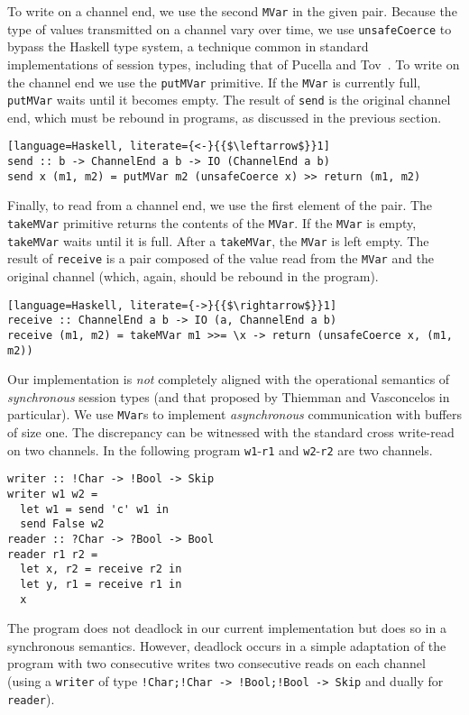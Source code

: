 To write on a channel end, we use the second \lstinline|MVar| in the
given pair. Because the type of values transmitted on a channel vary
over time, we use \lstinline|unsafeCoerce| to bypass the Haskell type
system, a technique common in standard implementations of session
types, including that of Pucella and
Tov~\cite{DBLP:conf/haskell/PucellaT08}. To write on the channel end
we use the \lstinline|putMVar| primitive. If the \lstinline|MVar| is
currently full, \lstinline|putMVar| waits until it becomes empty.  The
result of \lstinline|send| is the original channel end, which must be
rebound in programs, as discussed in the previous section.
%
\begin{lstlisting}[language=Haskell, literate={<-}{{$\leftarrow$}}1]
send :: b -> ChannelEnd a b -> IO (ChannelEnd a b)
send x (m1, m2) = putMVar m2 (unsafeCoerce x) >> return (m1, m2)
\end{lstlisting}

Finally, to read from a channel end, we use the first element of the
pair. The \lstinline|takeMVar| primitive returns the contents of the
\lstinline|MVar|. If the \lstinline|MVar| is empty,
\lstinline|takeMVar| waits until it is full. After a
\lstinline|takeMVar|, the \lstinline|MVar| is left empty. The result
of \lstinline|receive| is a pair composed of the value read from the
\lstinline|MVar| and the original channel (which, again, should be
rebound in the program).
%
\begin{lstlisting}[language=Haskell, literate={->}{{$\rightarrow$}}1]
receive :: ChannelEnd a b -> IO (a, ChannelEnd a b)
receive (m1, m2) = takeMVar m1 >>= \x -> return (unsafeCoerce x, (m1, m2))
\end{lstlisting}

Our implementation is \emph{not} completely aligned with the
operational semantics of \emph{synchronous} session types (and that
proposed by Thiemman and Vasconcelos in particular). We use
\lstinline|MVar|s to implement \emph{asynchronous} communication with
buffers of size one. The discrepancy can be witnessed with the standard
cross write-read on two channels. In the following program
\lstinline|w1|-\lstinline|r1| and \lstinline|w2|-\lstinline|r2| are
two channels.
%
\begin{lstlisting}
writer :: !Char -> !Bool -> Skip
writer w1 w2 =
  let w1 = send 'c' w1 in
  send False w2
reader :: ?Char -> ?Bool -> Bool
reader r1 r2 =
  let x, r2 = receive r2 in
  let y, r1 = receive r1 in
  x
\end{lstlisting}
%
The program does not deadlock in our current implementation but does
so in a synchronous semantics. However, deadlock occurs in a simple
adaptation of the program with two consecutive writes two consecutive
reads on each channel (using a \lstinline|writer| of type
\lstinline|!Char;!Char -> !Bool;!Bool -> Skip| and dually for
\lstinline|reader|).

